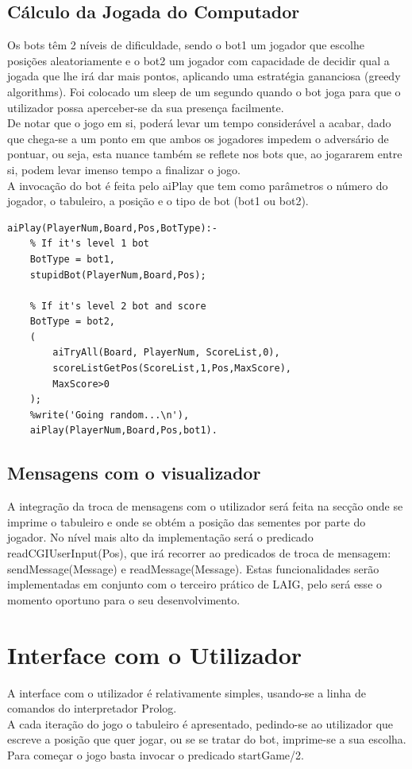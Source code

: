 \documentclass[15pt,a4paper]{article}
\begin{document}
\subsection{Cálculo da Jogada do Computador}
Os bots têm 2 níveis de dificuldade, sendo o bot1 um jogador que escolhe posições aleatoriamente e o bot2 um jogador com capacidade de decidir qual a jogada que lhe irá dar mais pontos, aplicando uma estratégia gananciosa (greedy algorithms). Foi colocado um sleep de um segundo quando o bot joga para que o utilizador possa aperceber-se da sua presença facilmente.\\
\indent De notar que o jogo em si, poderá levar um tempo considerável a acabar, dado que chega-se a um ponto em que ambos os jogadores impedem o adversário de pontuar, ou seja, esta nuance também se reflete nos bots que, ao jogararem entre si, podem levar imenso tempo a finalizar o jogo.\\
\indent A invocação do bot é feita pelo aiPlay que tem como parâmetros o número do jogador, o tabuleiro, a posição e o tipo de bot (bot1 ou bot2).

\begin{verbatim}
aiPlay(PlayerNum,Board,Pos,BotType):-
	% If it's level 1 bot
	BotType = bot1,
	stupidBot(PlayerNum,Board,Pos);

	% If it's level 2 bot and score
	BotType = bot2,
	(
		aiTryAll(Board, PlayerNum, ScoreList,0),
		scoreListGetPos(ScoreList,1,Pos,MaxScore),
		MaxScore>0
	);
	%write('Going random...\n'),
	aiPlay(PlayerNum,Board,Pos,bot1).

\end{verbatim}


\subsection{Mensagens com o visualizador}
A integração da troca de mensagens com o utilizador será feita na secção onde se imprime o tabuleiro e onde se obtém a posição das sementes por parte do jogador. No nível mais alto da implementação será o predicado readCGIUserInput(Pos), que irá recorrer ao predicados de troca de mensagem: sendMessage(Message) e readMessage(Message). Estas funcionalidades serão implementadas em conjunto com o terceiro prático de LAIG, pelo será esse o momento oportuno para o seu desenvolvimento.


\section{Interface com o Utilizador}
A interface com o utilizador é relativamente simples, usando-se a linha de comandos do interpretador Prolog. \\
\indent A cada iteração do jogo o tabuleiro é apresentado, pedindo-se ao utilizador que escreve a posição que quer jogar, ou se se tratar do bot, imprime-se a sua escolha. Para começar o jogo basta invocar o predicado startGame/2.
\end{document}
